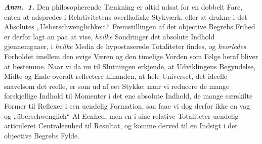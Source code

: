 \documentclass[12pt]{book}
\newcommand{\anm}[1]{\emph{\textbf{Anm.~#1.}}}
\newcommand{\opage}[1]{\marginnote{\footnotesize\textit{[#1]}}}
\begin{document}
\anm{1} Den philosopherende Tænkning er altid udsat for en dobbelt Fare, enten at
adspredes i Relativitetens overfladiske Stykværk, eller at drukne i det Absolutes
„Ueberschwenglichkeit.“ Fremstillingen af det objective Begrebs Frihed er derfor lagt
an paa at vise, \emph{hvilke} Sondringer det absolute Indhold gjennemgaaer, i
\emph{hvilke} Media de hypostaserede Totaliteter findes, og \emph{hvorledes} Forholdet
\opage{248} imellem den evige Væren og den timelige Vorden som Følge heraf bliver at bestemme.
Naar vi da nu til Slutningen erkjende, at Udviklingens Begyndelse, Midte og Ende
overalt reflectere hinanden, at hele Universet, det ideelle saavelsom det reelle, er
som ud af eet Stykke; naar vi reducere de mange forskjellige Indhold til Momenter i
det ene absolute Indhold, de mange særskilte Former til Reflexer i een uendelig
Formation, saa faae vi dog derfor ikke en vag og „überschwenglich“ Al-Eenhed, men en i
sine relative Totaliteter uendelig articuleret Centraleenhed til Resultat, og komme
derved til en Indsigt i det objective Begrebs Fylde.
\end{document}
